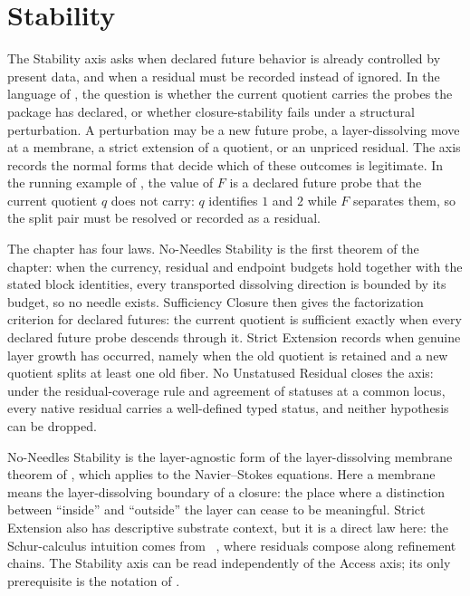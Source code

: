 \section{Stability}\label{sec:stability}

The Stability axis asks when declared future behavior is already
controlled by present data, and when a residual must be recorded
instead of ignored.  In the language of , the
question is whether the current quotient carries the probes the
package has declared, or whether closure-stability fails under a
structural perturbation.  A perturbation may be a new future probe,
a layer-dissolving move at a membrane, a strict extension of a
quotient, or an unpriced residual.  The axis records the normal
forms that decide which of these outcomes is legitimate.
In the running example of , the value of \(F\) is a
declared future probe that the current quotient \(q\) does not carry:
\(q\) identifies \(1\) and \(2\) while \(F\) separates them, so the
split pair must be resolved or recorded as a residual.

The chapter has four laws.  No-Needles Stability is the first theorem of the chapter: when the
currency, residual and endpoint budgets hold together with the stated block
identities, every transported dissolving direction is bounded by its budget,
so no needle exists.  Sufficiency Closure then gives the
factorization criterion for declared futures: the current quotient is
sufficient exactly when every declared future probe descends through
it.  Strict Extension records when genuine layer growth has occurred,
namely when the old quotient is retained and a new quotient splits at
least one old fiber.  No Unstatused Residual closes the axis: under the
residual-coverage rule and agreement of statuses at a common locus, every
native residual carries a well-defined typed status, and neither hypothesis
can be dropped.

No-Needles Stability is the layer-agnostic form of the layer-dissolving
membrane theorem of \citet{Tsiokos2026NeedleKiller}, which
\citet{Tsiokos2026NavierStokes} applies to the Navier--Stokes
equations.  Here a membrane means the
layer-dissolving boundary of a closure: the place where a distinction
between ``inside'' and ``outside'' the layer can cease to be
meaningful.  Strict Extension also has descriptive substrate context,
but it is a direct law here: the Schur-calculus intuition comes from
\PaperAR\ \citep{Tsiokos2026XiCompanion}, where residuals compose
along refinement chains.  The Stability axis can be read
independently of the Access axis; its only prerequisite is the
notation of .


